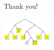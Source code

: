 \documentclass[xcolor=svgnames,12pt]{beamer}
\newenvironment{xframe}[1][]
  {\begin{frame}[fragile,environment=xframe,#1]}
  {\end{frame}}
\begin{document}
\begin{xframe}
  \begin{center}
    Thank you! \bigskip

    \includegraphics[width=1in]{deriv-tree}

  \end{center}
\end{xframe}


\end{document}
